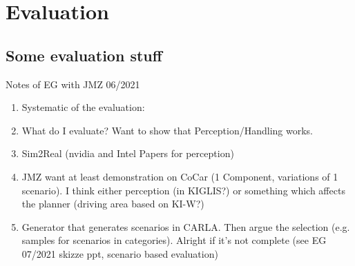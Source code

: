 \chapter{Evaluation}
\label{chap:evaluation}

\section{Some evaluation stuff}

Notes of EG with JMZ 06/2021

\begin{enumerate}
    \item Systematic of the evaluation:
    \item What do I evaluate? Want to show that Perception/Handling works.
    \item Sim2Real (nvidia and Intel Papers for perception)
    \item JMZ want at least demonstration on CoCar (1 Component, variations of 1 scenario). I think either perception (in KIGLIS?) or something which affects the planner (driving area based on KI-W?)
    \item Generator that generates scenarios in CARLA. Then argue the selection (e.g. samples for scenarios in categories). Alright if it's not complete (see EG 07/2021 skizze ppt, scenario based evaluation)

\end{enumerate}
